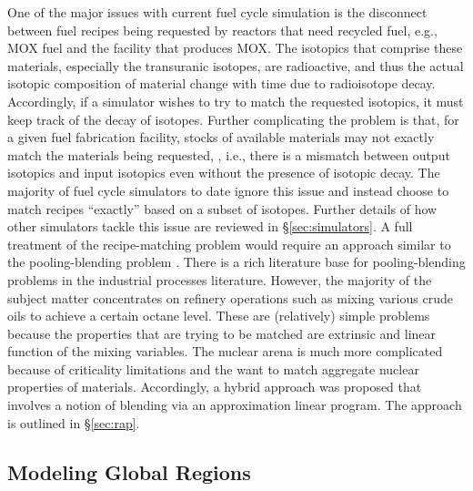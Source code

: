One of the major issues with current fuel cycle simulation is the disconnect
between fuel recipes being requested by reactors that need recycled fuel, e.g.,
MOX fuel and the facility that produces MOX. The isotopics that comprise these
materials, especially the transuranic isotopes, are radioactive, and thus the
actual isotopic composition of material change with time due to radioisotope
decay. Accordingly, if a simulator wishes to try to match the requested
isotopics, it must keep track of the decay of isotopes.  Further complicating
the problem is that, for a given fuel fabrication facility, stocks of available
materials may not exactly match the materials being requested, , i.e., there is
a mismatch between output isotopics and input isotopics even without the
presence of isotopic decay.  The majority of fuel cycle simulators to date
ignore this issue and instead choose to match recipes ``exactly'' based on a
subset of isotopes. Further details of how other simulators tackle this issue
are reviewed in \S\ref{sec:simulators}. A full treatment of the recipe-matching
problem would require an approach similar to the pooling-blending problem
\cite{tawarmalani_convexification_2002}. There is a rich literature base for
pooling-blending problems
\cite{glen_mixed_1988,rigby_evolution_1995,mendez_simultaneous_2006,misener_advances_2009}
in the industrial processes literature. However, the majority of the subject
matter concentrates on refinery operations such as mixing various crude oils to
achieve a certain octane level. These are (relatively) simple problems because
the properties that are trying to be matched are extrinsic and linear function
of the mixing variables. The nuclear arena is much more complicated because of
criticality limitations and the want to match aggregate nuclear properties of
materials. Accordingly, a hybrid approach was proposed that involves a notion of
blending via an approximation linear program. The approach is outlined in
\S\ref{sec:rap}.

\subsection{Modeling Global Regions}

